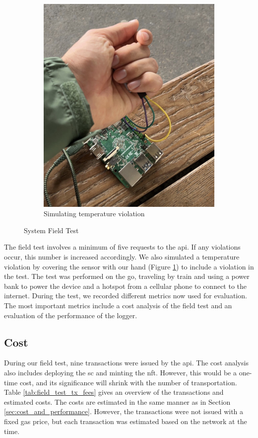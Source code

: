 \begin{figure}[ht]
\begin{subfigure}{0.5\textwidth}
        \includegraphics[height=0.25\textheight]{resources/cover_sensor.jpeg}
        \caption{Simulating temperature violation}
        \label{fig:covering_sensor}
    \end{subfigure}
    \caption{System Field Test}
    \label{fig:field_test}
\end{figure}

The field test involves a minimum of five requests to the \gls{api}. If any violations occur, this number is increased accordingly. We also simulated a temperature violation by covering the sensor with our hand (Figure \ref{fig:covering_sensor}) to include a violation in the test. The test was performed on the go, traveling by train and using a power bank to power the device and a hotspot from a cellular phone to connect to the internet. During the test, we recorded different metrics now used for evaluation. The most important metrics include a cost analysis of the field test and an evaluation of the performance of the logger.

\subsection{Cost}
During our field test, nine transactions were issued by the \gls{api}. The cost analysis also includes deploying the \gls{sc} and minting the \gls{nft}. However, this would be a one-time cost, and its significance will shrink with the number of transportation. Table \ref{tab:field_test_tx_fees} gives an overview of the transactions and estimated costs. The costs are estimated in the same manner as in Section \ref{sec:cost_and_performance}. However, the transactions were not issued with a fixed gas price, but each transaction was estimated based on the network at the time. 

